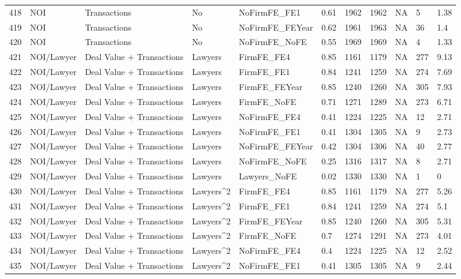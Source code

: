 \documentclass{article}
\begin{document}
\begin{table}[H]
\begin{tabular}{rllllllllll}
  418 & NOI & Transactions & No & NoFirmFE\_FE1 & 0.61 & 1962 & 1962 & NA & 5 & 1.38 \\ 
  419 & NOI & Transactions & No & NoFirmFE\_FEYear & 0.62 & 1961 & 1963 & NA & 36 & 1.4 \\ 
  420 & NOI & Transactions & No & NoFirmFE\_NoFE & 0.55 & 1969 & 1969 & NA & 4 & 1.33 \\ 
  421 & NOI/Lawyer & Deal Value + Transactions & Lawyers & FirmFE\_FE4 & 0.85 & 1161 & 1179 & NA & 277 & 9.13 \\ 
  422 & NOI/Lawyer & Deal Value + Transactions & Lawyers & FirmFE\_FE1 & 0.84 & 1241 & 1259 & NA & 274 & 7.69 \\ 
  423 & NOI/Lawyer & Deal Value + Transactions & Lawyers & FirmFE\_FEYear & 0.85 & 1240 & 1260 & NA & 305 & 7.93 \\ 
  424 & NOI/Lawyer & Deal Value + Transactions & Lawyers & FirmFE\_NoFE & 0.71 & 1271 & 1289 & NA & 273 & 6.71 \\ 
  425 & NOI/Lawyer & Deal Value + Transactions & Lawyers & NoFirmFE\_FE4 & 0.41 & 1224 & 1225 & NA & 12 & 2.71 \\ 
  426 & NOI/Lawyer & Deal Value + Transactions & Lawyers & NoFirmFE\_FE1 & 0.41 & 1304 & 1305 & NA & 9 & 2.73 \\ 
  427 & NOI/Lawyer & Deal Value + Transactions & Lawyers & NoFirmFE\_FEYear & 0.42 & 1304 & 1306 & NA & 40 & 2.77 \\ 
  428 & NOI/Lawyer & Deal Value + Transactions & Lawyers & NoFirmFE\_NoFE & 0.25 & 1316 & 1317 & NA & 8 & 2.71 \\ 
  429 & NOI/Lawyer & Deal Value + Transactions & Lawyers & Lawyers\_NoFE & 0.02 & 1330 & 1330 & NA & 1 & 0 \\ 
  430 & NOI/Lawyer & Deal Value + Transactions & Lawyers^2 & FirmFE\_FE4 & 0.85 & 1161 & 1179 & NA & 277 & 5.26 \\ 
  431 & NOI/Lawyer & Deal Value + Transactions & Lawyers^2 & FirmFE\_FE1 & 0.84 & 1241 & 1259 & NA & 274 & 5.1 \\ 
  432 & NOI/Lawyer & Deal Value + Transactions & Lawyers^2 & FirmFE\_FEYear & 0.85 & 1240 & 1260 & NA & 305 & 5.31 \\ 
  433 & NOI/Lawyer & Deal Value + Transactions & Lawyers^2 & FirmFE\_NoFE & 0.7 & 1274 & 1291 & NA & 273 & 4.01 \\ 
  434 & NOI/Lawyer & Deal Value + Transactions & Lawyers^2 & NoFirmFE\_FE4 & 0.4 & 1224 & 1225 & NA & 12 & 2.52 \\ 
  435 & NOI/Lawyer & Deal Value + Transactions & Lawyers^2 & NoFirmFE\_FE1 & 0.41 & 1305 & 1305 & NA & 9 & 2.44 \\ 

\end{tabular}
\end{table}
\end{document}
